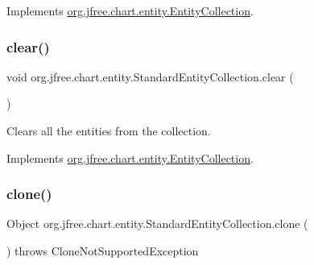 Implements \mbox{\hyperlink{interfaceorg_1_1jfree_1_1chart_1_1entity_1_1_entity_collection_a8085e4a67b6483c092a73b4298fd2193}{org.\+jfree.\+chart.\+entity.\+Entity\+Collection}}.

\mbox{\label{classorg_1_1jfree_1_1chart_1_1entity_1_1_standard_entity_collection_adf0e1158e1b1505658fd5620b111f477}} 
\subsubsection{\texorpdfstring{clear()}{clear()}}
{\footnotesize\ttfamily void org.\+jfree.\+chart.\+entity.\+Standard\+Entity\+Collection.\+clear (\begin{DoxyParamCaption}{ }\end{DoxyParamCaption})}

Clears all the entities from the collection. 

Implements \mbox{\hyperlink{interfaceorg_1_1jfree_1_1chart_1_1entity_1_1_entity_collection_a425608737568917935db291594224dd5}{org.\+jfree.\+chart.\+entity.\+Entity\+Collection}}.

\mbox{\label{classorg_1_1jfree_1_1chart_1_1entity_1_1_standard_entity_collection_a1f7eb283f861a417278c03951633c2ff}} 
\subsubsection{\texorpdfstring{clone()}{clone()}}
{\footnotesize\ttfamily Object org.\+jfree.\+chart.\+entity.\+Standard\+Entity\+Collection.\+clone (\begin{DoxyParamCaption}{ }\end{DoxyParamCaption}) throws Clone\+Not\+Supported\+Exception}

